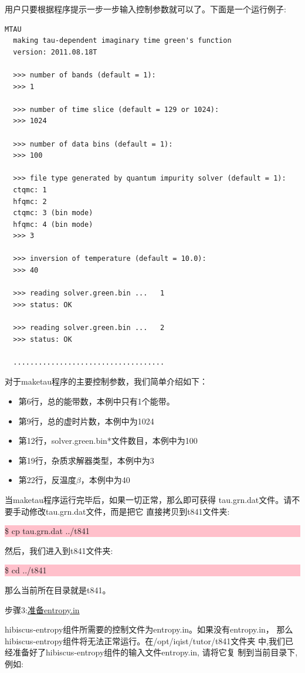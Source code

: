 用户只要根据程序提示一步一步输入控制参数就可以了。下面是一个运行例子:
\begin{lstlisting}[frame=single]
  MTAU
  making tau-dependent imaginary time green's function
  version: 2011.08.18T
 
  >>> number of bands (default = 1):
  >>> 1
 
  >>> number of time slice (default = 129 or 1024):
  >>> 1024
 
  >>> number of data bins (default = 1):
  >>> 100
 
  >>> file type generated by quantum impurity solver (default = 1):
  ctqmc: 1
  hfqmc: 2
  ctqmc: 3 (bin mode)
  hfqmc: 4 (bin mode)
  >>> 3
 
  >>> inversion of temperature (default = 10.0):
  >>> 40
 
  >>> reading solver.green.bin ...   1
  >>> status: OK
 
  >>> reading solver.green.bin ...   2
  >>> status: OK

  ....................................
\end{lstlisting}
对于maketau程序的主要控制参数，我们简单介绍如下：
\begin{itemize}
  \item 第6行，总的能带数，本例中只有1个能带。
  \item 第9行，总的虚时片数，本例中为1024
  \item 第12行，solver.green.bin*文件数目，本例中为100
  \item 第19行，杂质求解器类型，本例中为3
  \item 第22行，反温度$\beta$，本例中为40
\end{itemize}
当maketau程序运行完毕后，如果一切正常，那么即可获得
tau.grn.dat文件。请不要手动修改tau.grn.dat文件，而是把它
直接拷贝到t841文件夹:

\noindent\colorbox{pink}{\parbox[r]{\linewidth}{\quad \$ cp tau.grn.dat ../t841 }}

然后，我们进入到t841文件夹:

\noindent\colorbox{pink}{\parbox[r]{\linewidth}{\quad \$ cd ../t841 }}

那么当前所在目录就是t841。

步骤3:\underline{准备entropy.in}

hibiscus-entropy组件所需要的控制文件为entropy.in。如果没有entropy.in，
那么hibiscus-entropy组件将无法正常运行。在/opt/iqist/tutor/t841文件夹
中,我们已经准备好了hibiscus-entropy组件的输入文件entropy.in, 请将它复
制到当前目录下,例如:


